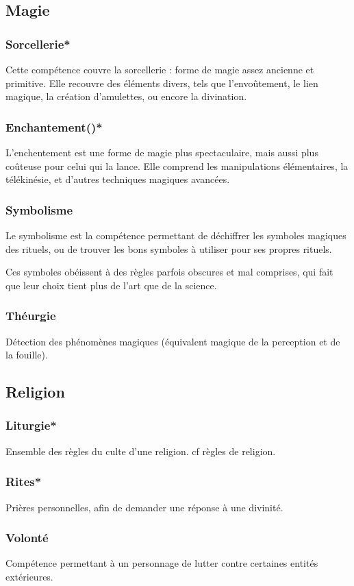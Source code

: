 \documentclass[10pt,a4paper,twocolumn]{book}
\begin{document}
\subsection{Magie}
\subsubsection{Sorcellerie*}
Cette compétence couvre la sorcellerie : forme de magie assez ancienne et primitive. Elle recouvre des éléments divers, tels que l'envoûtement, le lien magique, la création d'amulettes, ou encore la divination.
\subsubsection{Enchantement()*}
L'enchentement est une forme de magie plus spectaculaire, mais aussi plus coûteuse pour celui qui la lance. Elle comprend les manipulations élémentaires, la télékinésie, et d'autres techniques magiques avancées.
\subsubsection{Symbolisme}
Le symbolisme est la compétence permettant de déchiffrer les symboles magiques des rituels, ou de trouver les bons symboles à utiliser pour ses propres rituels.

Ces symboles obéissent à des règles parfois obscures et mal comprises, qui fait que leur choix tient plus de l'art que de la science.
\subsubsection{Théurgie}
Détection des phénomènes magiques (équivalent magique de la perception et de la fouille).
\subsection{Religion}
\subsubsection{Liturgie*}
Ensemble des règles du culte d’une religion. cf règles de religion.
\subsubsection{Rites*}
Prières personnelles, afin de demander une réponse à une divinité.
\subsubsection{Volonté}
Compétence permettant à un personnage de lutter contre certaines entités extérieures.
\end{document}
